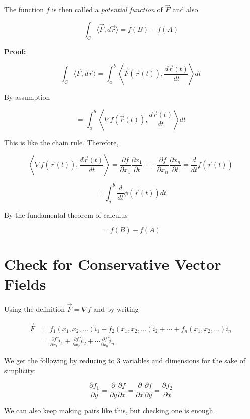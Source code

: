 The function \( f \) is then called a \emph{potential function} of \( \vec{F} \) and also 

\[
    \int_C \langle \vec{F}, d\vec{r} \rangle = f(B) - f(A) 
\]

\textbf{Proof:}

\[
    \int_C \langle \vec{F}, d\vec{r} \rangle = \int_{a}^{b} \left\langle \vec{F}(\vec{r}(t)), \frac{d\vec{r}(t)}{dt} \right\rangle dt
\]

By assumption 

\[
    = \int_{a}^{b} \left\langle \nabla f(\vec{r}(t)), \frac{d\vec{r}(t)}{dt} \right\rangle dt
\]

This is like the chain rule. Therefore, 

\[
    \left\langle \nabla f (\vec{r}(t)), \frac{d\vec{r}(t)}{dt} \right\rangle =
    \frac{\partial f}{\partial x_1} \frac{\partial x_1}{\partial t} + \cdots
    \frac{\partial f}{\partial x_n} \frac{\partial x_n}{\partial t} = \frac{d}{dt}f(\vec{r}(t))
\]

\[
    = \int_{a}^{b} \frac{d}{dt} \phi(\vec{r}(t))dt
\]

By the fundamental theorem of calculus 

\[
    = f(B) - f(A)
\]

\QED

\section{Check for Conservative Vector Fields}

Using the definition \(\vec{F} = \nabla f\) and by writing 

\begin{align*}
    \vec{F} &= f_1(x_1,x_2,\dots)\hat{i}_1 + f_2(x_1, x_2, \dots)\hat{i}_2 + \cdots + f_n(x_1, x_2, \dots)\hat{i}_n \\ 
            &= \frac{\partial f}{\partial x_1}\hat{i}_1 + \frac{\partial f}{\partial x_2}\hat{i}_2 + \cdots \frac{\partial f}{\partial x_n}\hat{i}_n  
\end{align*}

We get the following by reducing to 3 variables and dimensions for the sake of simplicity:

\[
    \frac{\partial f_1}{\partial y} = \frac{\partial}{\partial y} \frac{\partial f}{\partial x} = 
    \frac{\partial}{\partial x} \frac{\partial f}{\partial y} = \frac{\partial f_2}{\partial x}
\]

We can also keep making pairs like this, but checking one is enough. 

